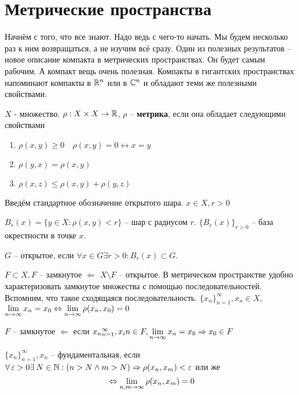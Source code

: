 \documentclass[document]{subfiles}
\begin{document}
\chapter{Метрические пространства}
Начнём с того, что все знают. Надо ведь с чего-то начать. Мы будем несколько раз к ним возвращаться, а не изучим всё сразу. Один из полезных результатов -- новое описание компакта в метрических пространствах. Он будет
самым рабочим. А компакт вещь очень полезная. Компакты в гигантских пространствах напоминают компакты в $\mathbb{R}^n$ или в $\mathbb{C}^n$ и обладают теми же полезными свойствами.

\begin{definition}[Метрика]
    $X$ - множество. $\rho: X \times X \rightarrow \mathbb{R}$, $\rho$ -- \textbf{метрика}, если она обладает следующими свойствами
    \begin{enumerate}
        \item $\rho(x,y) \geq 0 \quad \rho(x,y) = 0 \leftrightarrow x = y$
        \item $\rho(y,x) = \rho(x,y)$
        \item $\rho(x,z) \leq \rho(x,y) + \rho(y,z)$
    \end{enumerate}
\end{definition}

Введём стандартное обозначение открытого шара. $x \in X, r > 0$

$B_r(x) = \{y \in X: \rho(x,y) < r \}$ -- шар с радиусом $r$.
$ \{B_r(x) \}_{r > 0}$ -- база окрестности в точке $x$.

$G$ -- открытое, если $\forall x \in G \exists r > 0 : B_r(x) \subset G$.

$F \subset X, F$ -- замкнутое $\Leftarrow$ $X \setminus F$ -- открытое.
В метрическом пространстве удобно характеризовать замкнутое множества с помощью последовательностей. Вспомним, что такое сходящаяся последовательность.
$\{x_n\}_{n=1}^\infty, x_n \in X$, $\lim\limits_{n \to \infty} x_n = x_0 \Leftrightarrow \lim\limits_{n \to \infty} \rho(x_n, x_0) = 0$

$F$ -- замкнутое $\Leftarrow$ если ${x_n}_{n=1}^\infty, x_in \in F, \lim\limits_{n \to \infty } x_n = x_0 \Rightarrow x_0 \in F$


\begin{definition}
    $\{x_n\}^\infty_{n=1}, x_n$ -- фундаментальная, если $\forall \varepsilon > 0 \exists N \in \bN : (n > N \wedge m > N) \Rightarrow \rho(x_n, x_m) < \varepsilon$
    или же 
    \[ \Leftrightarrow \lim\limits_{n,m \to \infty} \rho(x_n,x_m) = 0 \]
\end{definition}
\end{document}
